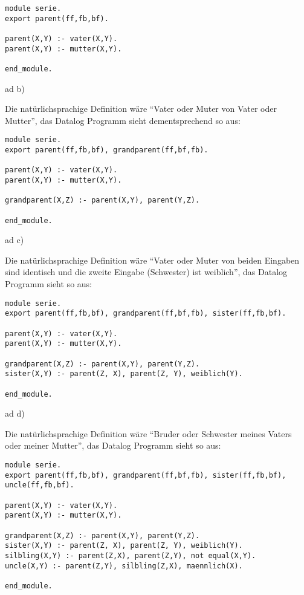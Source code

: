\documentclass[12pt,a4paper]{amsart}
\begin{document}
\begin{lstlisting}
module serie.
export parent(ff,fb,bf).

parent(X,Y) :- vater(X,Y).
parent(X,Y) :- mutter(X,Y).

end_module.
\end{lstlisting}

\medskip

ad b)

Die natürlichsprachige Definition wäre ``Vater oder Muter von Vater oder Mutter'', das Datalog Programm sieht dementsprechend so aus:

\begin{lstlisting}
module serie.
export parent(ff,fb,bf), grandparent(ff,bf,fb).

parent(X,Y) :- vater(X,Y).
parent(X,Y) :- mutter(X,Y).

grandparent(X,Z) :- parent(X,Y), parent(Y,Z).

end_module.
\end{lstlisting}

\medskip

ad c)

Die natürlichsprachige Definition wäre ``Vater oder Muter von beiden Eingaben sind identisch und die zweite Eingabe (Schwester) ist weiblich'', das Datalog Programm sieht so aus:

\begin{lstlisting}
module serie.
export parent(ff,fb,bf), grandparent(ff,bf,fb), sister(ff,fb,bf).

parent(X,Y) :- vater(X,Y).
parent(X,Y) :- mutter(X,Y).

grandparent(X,Z) :- parent(X,Y), parent(Y,Z).
sister(X,Y) :- parent(Z, X), parent(Z, Y), weiblich(Y).

end_module.
\end{lstlisting}

\medskip

ad d)

Die natürlichsprachige Definition wäre ``Bruder oder Schwester meines Vaters oder meiner Mutter'', das Datalog Programm sieht so aus:

\begin{lstlisting}
module serie.
export parent(ff,fb,bf), grandparent(ff,bf,fb), sister(ff,fb,bf), uncle(ff,fb,bf).

parent(X,Y) :- vater(X,Y).
parent(X,Y) :- mutter(X,Y).

grandparent(X,Z) :- parent(X,Y), parent(Y,Z).
sister(X,Y) :- parent(Z, X), parent(Z, Y), weiblich(Y).
silbling(X,Y) :- parent(Z,X), parent(Z,Y), not equal(X,Y).
uncle(X,Y) :- parent(Z,Y), silbling(Z,X), maennlich(X).

end_module.
\end{lstlisting}
\end{document}
